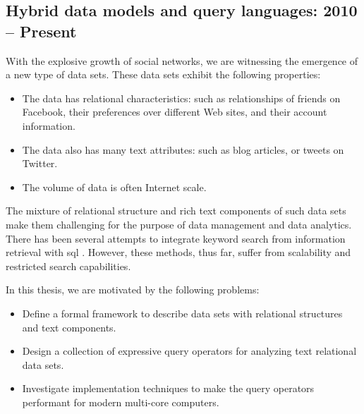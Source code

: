 	\subsection{Hybrid data models and query languages: 2010 -- Present}
		With the explosive growth of social networks, we are witnessing the emergence of a new type of data sets.  These data sets exhibit the following properties:
		
		\begin{itemize}
			\item The data has relational characteristics: such as relationships of friends on Facebook, their preferences over different Web sites, and their account information.
			\item The data also has many text attributes: such as blog articles, or tweets on Twitter.
			\item The volume of data is often Internet scale.
		\end{itemize}
		
		The mixture of relational structure and rich text components of such data sets make them challenging for the purpose of data management and data analytics.  There has been several attempts to integrate keyword search from information retrieval with \gls{sql} \cite{banks-02, fuzzy-11, ir-03}.  However, these methods, thus far, suffer from scalability and restricted search capabilities.
		
		In this thesis, we are motivated by the following problems:
		
		\begin{itemize}
			\item Define a formal framework to describe data sets with relational structures and text components.
			\item Design a collection of expressive query operators for analyzing text relational data sets.
			\item Investigate implementation techniques to make the query operators performant for modern multi-core computers.
		\end{itemize}
